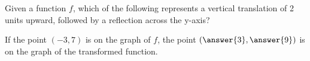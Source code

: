 \documentclass{ximera}
\author{David Kish}
\begin{document}
\begin{exercise}
Given a function $f$, which of the following represents a vertical translation of 2 units upward, followed by a reflection across the y-axis?

\begin{multipleChoice}  
\end{multipleChoice}  

\begin{exercise}
If the point $(-3, 7)$ is on the graph of $f$, the point $(\answer{3}, \answer{9})$ is on the graph of the transformed function.
\end{exercise}
\end{exercise}
\end{document}

